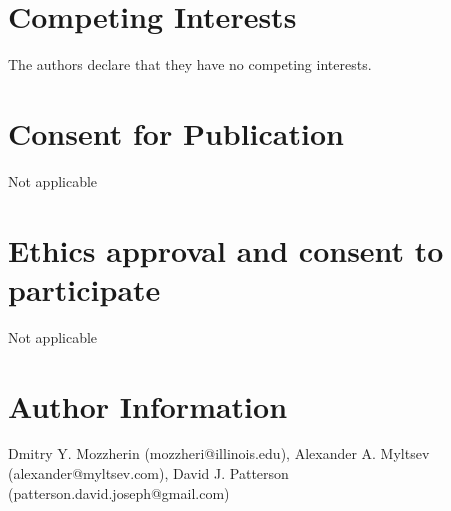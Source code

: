 \documentclass{bmcart}
\begin{document}
\section*{Competing Interests}

The authors declare that they have no competing interests.

\section*{Consent for Publication}

Not applicable

\section*{Ethics approval and consent to participate}

Not applicable

\section*{Author Information}

Dmitry Y. Mozzherin (mozzheri@illinois.edu), Alexander A. Myltsev (alexander@myltsev.com), David J. Patterson (patterson.david.joseph@gmail.com)


\end{document}
